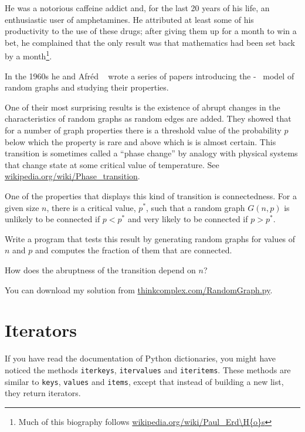 \documentclass[10pt]{book}
\begin{document}
He was a notorious caffeine addict and, for the last 20 years of his
life, an enthusiastic user of amphetamines.  He attributed at least
some of his productivity to the use of these drugs; after giving them
up for a month to win a bet, he complained that the only result
was that mathematics had
been set back by a month\footnote{Much of this biography follows
\url{wikipedia.org/wiki/Paul_Erd\H{o}s}}.

In the 1960s he and Afr\'{e}d \Renyi~ wrote a series of papers 
introducing the \Erdos-\Renyi~
model of random graphs and studying their properties.

One of their most surprising results is the existence of
abrupt changes in the characteristics of random graphs as
random edges are added.  They showed that for a number of
graph properties there is a threshold value of the probability
$p$ below which the property is rare and above which is
is almost certain.  This transition is sometimes called
a ``phase change'' by analogy with physical systems that
change state at some critical value of temperature.
See \url{wikipedia.org/wiki/Phase_transition}.


\begin{ex}

One of the properties that displays this kind of transition is
connectedness.  For a given size $n$, there is a critical value,
$p^*$, such that a random graph $G(n, p)$ is unlikely to be connected
if $p < p^*$ and very likely to be connected if $p > p^*$.

Write a program that tests this result by generating random graphs for
values of $n$ and $p$ and computes the fraction of them that
are connected.

How does the abruptness of the transition depend on $n$?

You can download my solution from
\url{thinkcomplex.com/RandomGraph.py}.

\end{ex}


\section{Iterators}

If you have read the documentation of Python dictionaries,
you might have noticed the methods {\tt iterkeys}, {\tt itervalues}
and {\tt iteritems}.  These methods are similar to {\tt keys},
{\tt values} and {\tt items}, except that instead of building
a new list, they return iterators.
\end{document}
